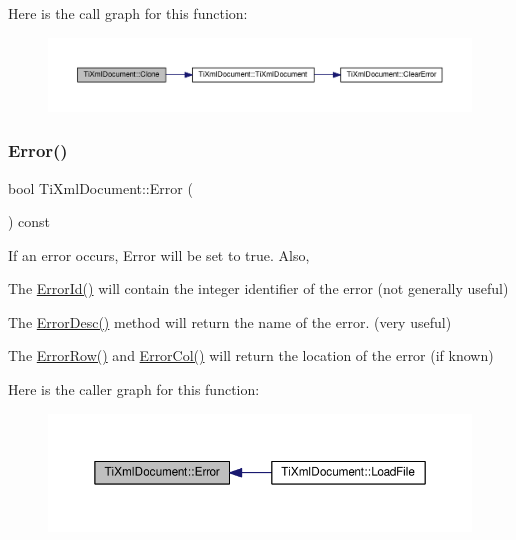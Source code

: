 Here is the call graph for this function\+:\nopagebreak
\begin{figure}[H]
\begin{center}
\leavevmode
\includegraphics[width=350pt]{class_ti_xml_document_a46a4dda6c56eb106d46d4046ae1e5353_cgraph}
\end{center}
\end{figure}
\mbox{\label{class_ti_xml_document_a348e68faad4a3498f413c51ee9bc321a}} 
\subsubsection{\texorpdfstring{Error()}{Error()}}
{\footnotesize\ttfamily bool Ti\+Xml\+Document\+::\+Error (\begin{DoxyParamCaption}{ }\end{DoxyParamCaption}) const\hspace{0.3cm}{\ttfamily [inline]}}

If an error occurs, Error will be set to true. Also,
\begin{DoxyItemize}
\item The \hyperlink{class_ti_xml_document_abd928b49a646c8ed53e0453c555d96a2}{Error\+Id()} will contain the integer identifier of the error (not generally useful)
\item The \hyperlink{class_ti_xml_document_aab511be262e84a003e3bb86f0215c8c2}{Error\+Desc()} method will return the name of the error. (very useful)
\item The \hyperlink{class_ti_xml_document_a062e5257128a7da31b0b2e38cd524600}{Error\+Row()} and \hyperlink{class_ti_xml_document_adea69de889449a2587afb8ee043f43f5}{Error\+Col()} will return the location of the error (if known) 
\end{DoxyItemize}Here is the caller graph for this function\+:\nopagebreak
\begin{figure}[H]
\begin{center}
\leavevmode
\includegraphics[width=350pt]{class_ti_xml_document_a348e68faad4a3498f413c51ee9bc321a_icgraph}
\end{center}
\end{figure}
\mbox{\label{class_ti_xml_document_adea69de889449a2587afb8ee043f43f5}} 
